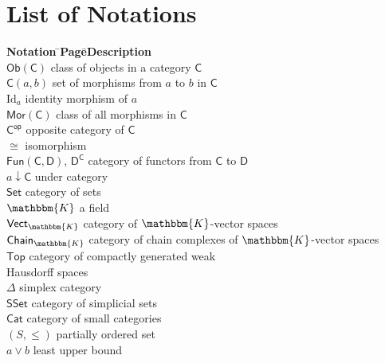 \documentclass[11pt]{amsbook}
\numberwithin{section}{chapter}
\numberwithin{subsection}{section}
\numberwithin{equation}{section}
\theoremstyle{plain}
\theoremstyle{definition}
\newcommand{\fieldk}{\mathbbm{K}}
\newcommand{\op}{\mathsf{op}}
\newcommand{\C}{\mathsf{C}}
\newcommand{\Cop}{\C^{\op}}
\newcommand{\D}{\mathsf{D}}
\newcommand{\Id}{\mathrm{Id}}
\newcommand{\Mor}{\mathsf{Mor}}
\newcommand{\Ob}{\mathsf{Ob}}
\newcommand{\Obc}{\Ob(\C)}
\newcommand{\Cat}{\mathsf{Cat}}
\newcommand{\Chaink}{\mathsf{Chain}_{\fieldk}}
\newcommand{\Fun}{\mathsf{Fun}}
\newcommand{\Set}{\mathsf{Set}}
\newcommand{\Sset}{\mathsf{SSet}}
\newcommand{\Top}{\mathsf{Top}}
\newcommand{\Vectk}{\mathsf{Vect}_{\fieldk}}
\begin{document}
\chapter*{List of Notations}

\newcommand{\where}[1]{\> \> \pageref{#1} \> \>}
\newcommand{\blob}{\> \> \> \> \hspace{2em}}

\begin{tabbing}
\textbf{Notation} \= \hspace{1.5cm}\= \textbf{Page}\= \hspace{.5cm}\=\textbf{Description} \\
$\Obc$ \where{notation:objects-category} class of objects in a category $\C$\\
$\C(a,b)$ \where{notation:morphism-set}  set of morphisms from $a$ to $b$ in $\C$\\
$\Id_a$ \where{notation:identity-morphism} identity morphism of $a$\\
$\Mor(\C)$ \where{notation:morphism-C} class of all morphisms in $\C$\\
$\Cop$ \where{notation:opposite-category} opposite category of $\C$\\
$\cong$ \where{notation:iso} isomorphism\\
$\Fun(\C,\D)$, $\D^{\C}$ \where{ex:functor-cat} category of functors from $\C$ to $\D$\\
$a \downarrow \C$ \where{ex:undercat} under category\\
$\Set$ \where{ex:set} category of sets\\
$\fieldk$ \where{notation:fieldk} a field\\
$\Vectk$ \where{ex:vectk} category of $\fieldk$-vector spaces\\
$\Chaink$ \where{ex:chaink} category of chain complexes of $\fieldk$-vector spaces\\
$\Top$ \where{ex:top} category of compactly generated weak\\
\blob Hausdorff spaces\\
$\Delta$ \where{ex:simplex-cat} simplex category\\ 
$\Sset$ \where{ex:simplicial-cat} category of simplicial sets\\
$\Cat$ \where{ex:cat} category of small categories\\
$(S,\leq)$ \where{ex:lattice} partially ordered set\\
$a \vee b$ \where{notation:lub} least upper bound\\

\end{tabbing}
\end{document}
